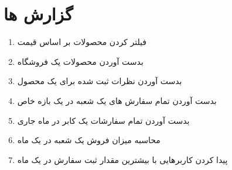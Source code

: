 \documentclass[]{article}
\begin{document}
\section{گزارش ها}
\begin{enumerate}
\item فیلتر کردن محصولات بر اساس قیمت
\item بدست آوردن محصولات یک فروشگاه
\item بدست آوردن نظرات ثبت شده برای یک محصول 
\item بدست آوردن تمام سفارش های یک شعبه در یک بازه خاص
\item بدست آوردن تمام سفارشات یک کابر در ماه جاری
\item محاسبه میزان فروش یک شعبه در یک ماه
\item پیدا کردن کاربرهایی با بیشترین مقدار ثبت سفارش در یک ماه

\end{enumerate}
\end{document}
